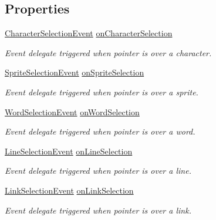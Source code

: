 \subsection*{Properties}
\begin{DoxyCompactItemize}
\item 
\hyperlink{classTMPro_1_1TMP__TextEventHandler_1_1CharacterSelectionEvent}{Character\+Selection\+Event} \hyperlink{classTMPro_1_1TMP__TextEventHandler_adf246c6977702948b7ab987f34bf12a2}{on\+Character\+Selection}
\begin{DoxyCompactList}\small\item\em Event delegate triggered when pointer is over a character. \end{DoxyCompactList}\item 
\hyperlink{classTMPro_1_1TMP__TextEventHandler_1_1SpriteSelectionEvent}{Sprite\+Selection\+Event} \hyperlink{classTMPro_1_1TMP__TextEventHandler_a363991aa14af2f191cc7c77846c134f9}{on\+Sprite\+Selection}
\begin{DoxyCompactList}\small\item\em Event delegate triggered when pointer is over a sprite. \end{DoxyCompactList}\item 
\hyperlink{classTMPro_1_1TMP__TextEventHandler_1_1WordSelectionEvent}{Word\+Selection\+Event} \hyperlink{classTMPro_1_1TMP__TextEventHandler_aaba688a88f61b13eecf99e05725e6985}{on\+Word\+Selection}
\begin{DoxyCompactList}\small\item\em Event delegate triggered when pointer is over a word. \end{DoxyCompactList}\item 
\hyperlink{classTMPro_1_1TMP__TextEventHandler_1_1LineSelectionEvent}{Line\+Selection\+Event} \hyperlink{classTMPro_1_1TMP__TextEventHandler_ae13d515549d0908bfaabb435239b59b0}{on\+Line\+Selection}
\begin{DoxyCompactList}\small\item\em Event delegate triggered when pointer is over a line. \end{DoxyCompactList}\item 
\hyperlink{classTMPro_1_1TMP__TextEventHandler_1_1LinkSelectionEvent}{Link\+Selection\+Event} \hyperlink{classTMPro_1_1TMP__TextEventHandler_aa2b47e6e7e685896cf95aa7386f8ab18}{on\+Link\+Selection}
\begin{DoxyCompactList}\small\item\em Event delegate triggered when pointer is over a link. \end{DoxyCompactList}\end{DoxyCompactItemize}


